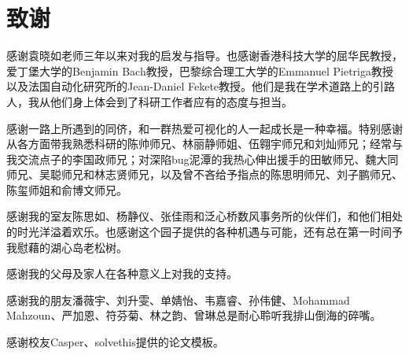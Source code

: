 
\chapter{致谢}
感谢袁晓如老师三年以来对我的启发与指导。也感谢香港科技大学的屈华民教授，爱丁堡大学的Benjamin Bach教授，巴黎综合理工大学的Emmanuel Pietriga教授以及法国自动化研究所的Jean-Daniel Fekete教授。他们是我在学术道路上的引路人，我从他们身上体会到了科研工作者应有的态度与担当。

感谢一路上所遇到的同侪，和一群热爱可视化的人一起成长是一种幸福。特别感谢从各方面带我熟悉科研的陈帅师兄、林丽静师姐、伍翱宇师兄和刘灿师兄；经常与我交流点子的李国政师兄；对深陷bug泥潭的我热心伸出援手的田敏师兄、魏大同师兄、吴聪师兄和林志贤师兄，以及曾不吝给予指点的陈思明师兄、刘子鹏师兄、陈玺师姐和俞博文师兄。

感谢我的室友陈思如、杨静仪、张佳雨和泛心桥数风事务所的伙伴们，和他们相处的时光洋溢着欢乐。也感谢这个园子提供的各种机遇与可能，还有总在第一时间予我慰藉的湖心岛老松树。

感谢我的父母及家人在各种意义上对我的支持。

感谢我的朋友潘薇宇、刘升雯、单婧怡、韦嘉睿、孙伟健、Mohammad Mahzoun、严加恩、符芬菊、林之韵、曾琳总是耐心聆听我排山倒海的碎嘴。

感谢校友Casper、solvethis提供的论文模板。

